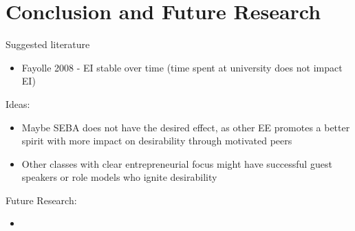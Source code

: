 \chapter{Conclusion and Future Research}\label{chapter:Conclusion}
Suggested literature
\begin{itemize}
\item Fayolle 2008 - EI stable over time (time spent at university does not impact EI)
\end{itemize}

Ideas:
\begin{itemize}
\item Maybe SEBA does not have the desired effect, as other EE promotes a better spirit with more impact on desirability through motivated peers
\item Other classes with clear entrepreneurial focus might have successful guest speakers or role models who ignite desirability
\end{itemize}

Future Research:
\begin{itemize}
\item 
\end{itemize}